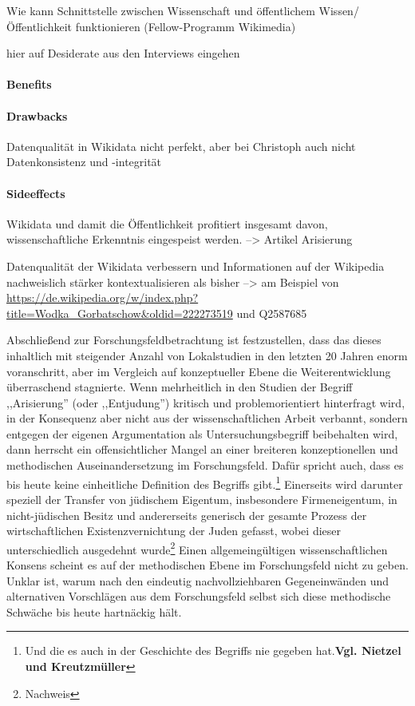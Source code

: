Wie kann Schnittstelle zwischen Wissenschaft und öffentlichem Wissen/ Öffentlichkeit funktionieren (Fellow-Programm Wikimedia)

hier auf Desiderate aus den Interviews eingehen

\paragraph{Benefits}

\paragraph{Drawbacks}

Datenqualität in Wikidata nicht perfekt, aber bei Christoph auch nicht
Datenkonsistenz und -integrität

\paragraph{Sideeffects}

Wikidata und damit die Öffentlichkeit profitiert insgesamt davon, wissenschaftliche Erkenntnis eingespeist werden. --> Artikel Arisierung 

Datenqualität der Wikidata verbessern und Informationen auf der Wikipedia nachweislich stärker kontextualisieren als bisher
--> am Beispiel von \url{https://de.wikipedia.org/w/index.php?title=Wodka_Gorbatschow&oldid=222273519} und Q2587685

Abschließend zur Forschungsfeldbetrachtung ist festzustellen, dass das dieses inhaltlich mit steigender Anzahl von Lokalstudien in den letzten 20 Jahren enorm voranschritt, aber im Vergleich auf konzeptueller Ebene die Weiterentwicklung überraschend stagnierte. Wenn mehrheitlich in den Studien der Begriff ,,Arisierung'' (oder ,,Entjudung'') kritisch und problemorientiert hinterfragt wird, in der Konsequenz aber nicht aus der wissenschaftlichen Arbeit verbannt, sondern entgegen der eigenen Argumentation als Untersuchungsbegriff beibehalten wird, dann herrscht ein offensichtlicher Mangel an einer breiteren konzeptionellen und methodischen Auseinandersetzung im Forschungsfeld. Dafür spricht auch, dass es bis heute keine einheitliche Definition des Begriffs gibt.\footnote{Und die es auch in der Geschichte des Begriffs nie gegeben hat.\textbf{Vgl. Nietzel und Kreutzmüller}} Einerseits wird darunter speziell der Transfer von jüdischem Eigentum, insbesondere Firmeneigentum, in nicht-jüdischen Besitz und andererseits generisch der gesamte Prozess der wirtschaftlichen Existenzvernichtung der Juden gefasst, wobei dieser unterschiedlich ausgedehnt wurde\footnote{Nachweis} Einen allgemeingültigen wissenschaftlichen Konsens scheint es auf der methodischen Ebene im Forschungsfeld nicht zu geben. Unklar ist, warum nach den eindeutig nachvollziehbaren Gegeneinwänden und alternativen Vorschlägen aus dem Forschungsfeld selbst sich diese methodische Schwäche bis heute hartnäckig hält.


